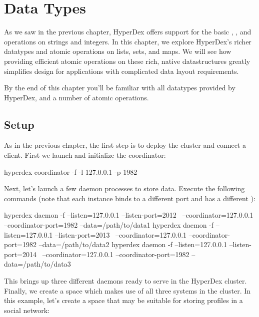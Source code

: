 \chapter{Data Types}
\label{chap:data-types}

As we saw in the previous chapter, HyperDex offers support for the basic
, , and  operations on strings and integers.
In this chapter, we explore HyperDex's richer datatypes and atomic operations on
lists, sets, and maps.  We will see how providing efficient atomic operations on
these rich, native datastructures greatly simplifies design for applications
with complicated data layout requirements.

By the end of this chapter you'll be familiar with all datatypes provided by
HyperDex, and a number of atomic operations.

\section{Setup}

As in the previous chapter, the first step is to deploy the cluster and connect
a client.   First we launch and initialize the coordinator:

\begin{consolecode}
hyperdex coordinator -f -l 127.0.0.1 -p 1982
\end{consolecode}

Next, let's launch a few daemon processes to store data.  Execute the following
commands (note that each instance binds to a different port and has a different
):

\begin{consolecode}
hyperdex daemon -f --listen=127.0.0.1 --listen-port=2012 \
                   --coordinator=127.0.0.1 --coordinator-port=1982 --data=/path/to/data1
hyperdex daemon -f --listen=127.0.0.1 --listen-port=2013 \
                   --coordinator=127.0.0.1 --coordinator-port=1982 --data=/path/to/data2
hyperdex daemon -f --listen=127.0.0.1 --listen-port=2014 \
                   --coordinator=127.0.0.1 --coordinator-port=1982 --data=/path/to/data3
\end{consolecode}

This brings up three different daemons ready to serve in the HyperDex cluster.
Finally, we create a space which makes use of all three systems in the cluster.
In this example, let's create a space that may be suitable for storing profiles
in a social network:

